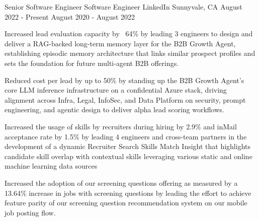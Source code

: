 
\begin{cventries}

  \cventry
    {Senior Software Engineer \break Software Engineer} %
    {LinkedIn} %
    {Sunnyvale, CA} %
    {August 2022 - Present \break August 2020 - August 2022} %
    {
      \begin{cvitems} %
        \item {Increased lead evaluation capacity by ~64\% by leading 3 engineers to design and deliver a RAG-backed long-term memory layer for the B2B Growth Agent, establishing episodic memory architecture that links similar prospect profiles and sets the foundation for future multi-agent B2B offerings.}
        \item {Reduced cost per lead by up to 50\% by standing up the B2B Growth Agent's core LLM inference infrastructure on a confidential Azure stack, driving alignment across Infra, Legal, InfoSec, and Data Platform on security, prompt engineering, and agentic design to deliver alpha lead scoring workflows.}
        \item {Increased the usage of skills by recruiters during hiring by 2.9\% and inMail acceptance rate by 1.5\% by leading 4 engineers and cross-team partners in the development of a dynamic Recruiter Search Skills Match Insight that highlights candidate skill overlap with contextual skills leveraging various static and online machine learning data sources }
        \item {Increased the adoption of our screening questions offering as measured by a 13.64\% increase in jobs with screening questions by leading the effort to achieve feature parity of our screening question recommendation system on our mobile job posting flow. }
      \end{cvitems}
    }
  

\end{cventries}
